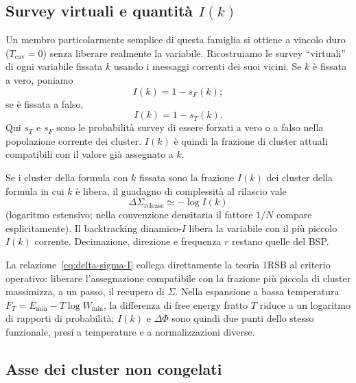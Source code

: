 \documentclass{article}
\newcommand{\Sig}{\Sigma}
\newcommand{\Tc}{T_{\mathrm{cav}}}
\begin{document}
\subsection{Survey virtuali e quantit\`a $I(k)$}

Un membro particolarmente semplice di questa famiglia si ottiene a vincolo duro ($\Tc=0$) senza liberare realmente la variabile.
Ricostruiamo le survey ``virtuali'' di ogni variabile fissata $k$ usando i messaggi correnti dei suoi vicini.
Se $k$ \`e fissata a vero, poniamo
\begin{equation}
  I(k)=1-s_F(k);
\end{equation}
se \`e fissata a falso,
\begin{equation}
  I(k)=1-s_T(k).
\end{equation}
Qui $s_T$ e $s_F$ sono le probabilit\`a survey di essere forzati a vero o a falso nella popolazione corrente dei cluster.
$I(k)$ \`e quindi la frazione di cluster attuali compatibili con il valore gi\`a assegnato a $k$.

Se i cluster della formula con $k$ fissata sono la frazione $I(k)$ dei cluster della formula in cui $k$ \`e libera, il guadagno di complessit\`a al rilascio vale
\begin{equation}
  \Delta\Sig_{\mathrm{release}}\simeq -\log I(k)
  \label{eq:delta-sigma-I}
\end{equation}
(logaritmo estensivo; nella convenzione densitaria il fattore $1/N$ compare esplicitamente).
Il backtracking dinamico-$I$ libera la variabile con il pi\`u piccolo $I(k)$ corrente.
Decimazione, direzione e frequenza $r$ restano quelle del BSP.

La relazione~\eqref{eq:delta-sigma-I} collega direttamente la teoria 1RSB al criterio operativo: liberare l'assegnazione compatibile con la frazione pi\`u piccola di cluster massimizza, a un passo, il recupero di $\Sig$.
Nella espansione a bassa temperatura $F_T=E_{\min}-T\log W_{\min}$, la differenza di free energy fratto $T$ riduce a un logaritmo di rapporti di probabilit\`a; $I(k)$ e $\Delta\Phi$ sono quindi due punti dello stesso funzionale, presi a temperature e a normalizzazioni diverse.

\subsection{Asse dei cluster non congelati}
\end{document}
